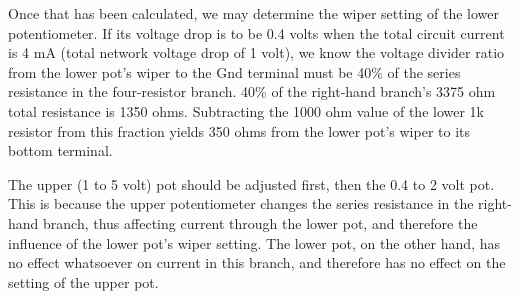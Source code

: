 \vskip 10pt

Once that has been calculated, we may determine the wiper setting of the lower potentiometer.  If its voltage drop is to be 0.4 volts when the total circuit current is 4 mA (total network voltage drop of 1 volt), we know the voltage divider ratio from the lower pot's wiper to the Gnd terminal must be 40\% of the series resistance in the four-resistor branch.  40\% of the right-hand branch's 3375 ohm total resistance is 1350 ohms.  Subtracting the 1000 ohm value of the lower 1k resistor from this fraction yields 350 ohms from the lower pot's wiper to its bottom terminal.


\vskip 10pt

The upper (1 to 5 volt) pot should be adjusted first, then the 0.4 to 2 volt pot.  This is because the upper potentiometer changes the series resistance in the right-hand branch, thus affecting current through the lower pot, and therefore the influence of the lower pot's wiper setting.  The lower pot, on the other hand, has no effect whatsoever on current in this branch, and therefore has no effect on the setting of the upper pot.




